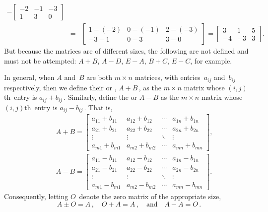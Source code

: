 \begin{example}
\begin{eqnarray*}
-\begin{bmatrix} -2 & -1 & -3\\ 1 & 3 & 0 \end{bmatrix}
\\&=&\begin{bmatrix} 1-(-2) & 0-(-1) & 2-(-3)\\ -3-1 & 0-3 & 3-0 \end{bmatrix}
=\begin{bmatrix} 3 &1 & 5\\ -4 & -3 & 3 \end{bmatrix}.
\end{eqnarray*}
But because the matrices are of different sizes, the following are not defined and must not be attempted: \(A+B\), \(A-D\), \(E-A\), \(B+C\), \(E-C\), for example.
\end{example}

In general, when \(A\) and~\(B\) are both \(m\times n\) matrices, with entries~\(a_{ij}\) and~\(b_{ij}\) respectively, then we define their  or , \(A+B\)\,, as the \(m\times n\) matrix whose \((i,j)\)th~entry is \(a_{ij}+b_{ij}\)\,.  
Similarly, define the  or  \(A-B\) as the \(m\times n\) matrix whose \((i,j)\)th~entry is \(a_{ij}-b_{ij}\)\,.
That is,
\begin{eqnarray*}&&
A+B=\begin{bmatrix} a_{11}+b_{11}&a_{12}+b_{12}&\cdots&a_{1n}+b_{1n}
\\a_{21}+b_{21}&a_{22}+b_{22}&\cdots&a_{2n}+b_{2n}
\\\vdots&\vdots&\ddots&\vdots
\\a_{m1}+b_{m1}&a_{m2}+b_{m2}&\cdots&a_{mn}+b_{mn} \end{bmatrix},
\\[1ex]&&
A-B=\begin{bmatrix} a_{11}-b_{11}&a_{12}-b_{12}&\cdots&a_{1n}-b_{1n}
\\a_{21}-b_{21}&a_{22}-b_{22}&\cdots&a_{2n}-b_{2n}
\\\vdots&\vdots&\ddots&\vdots
\\a_{m1}-b_{m1}&a_{m2}-b_{m2}&\cdots&a_{mn}-b_{mn} \end{bmatrix}.
\end{eqnarray*}
Consequently, letting \(O\)~denote the zero matrix of the appropriate size,  
\begin{equation*}
A\pm O=A\,,\quad
O+A=A\,,\quad\text{and}\quad
A-A=O\,.
\end{equation*}



